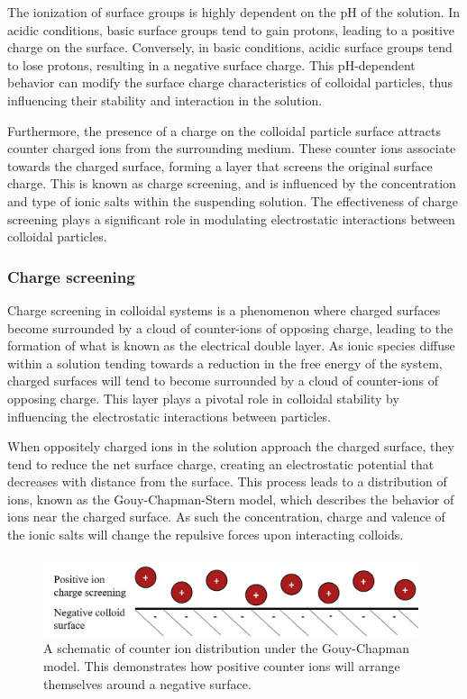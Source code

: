 The ionization of surface groups is highly dependent on the pH of the solution. In acidic conditions, basic surface groups tend to gain protons, leading to a positive charge on the surface. Conversely, in basic conditions, acidic surface groups tend to lose protons, resulting in a negative surface charge. This pH-dependent behavior can modify the surface charge characteristics of colloidal particles, thus influencing their stability and interaction in the solution.

Furthermore, the presence of a charge on the colloidal particle surface attracts counter charged ions from the surrounding medium. These counter ions associate towards the charged surface, forming a layer that screens the original surface charge. This is known as charge screening, and is influenced by the concentration and type of ionic salts within the suspending solution. The effectiveness of charge screening plays a significant role in modulating electrostatic interactions between colloidal particles.
\cite{Wennerstrom2017} \cite{lilBlueBook} \cite{israelachvili2011intermolecular}%

\subsubsection{Charge screening}



Charge screening in colloidal systems is a phenomenon where charged surfaces become surrounded by a cloud of counter-ions of opposing charge, leading to the formation of what is known as the electrical double layer. As ionic species diffuse within a solution tending towards a reduction in the free energy of the system, charged surfaces will tend to become surrounded by a cloud of counter-ions of opposing charge. This layer plays a pivotal role in colloidal stability by influencing the electrostatic interactions between particles. 

When oppositely charged ions in the solution approach the charged surface, they tend to reduce the net surface charge, creating an electrostatic potential that decreases with distance from the surface. This process leads to a distribution of ions, known as the Gouy-Chapman-Stern model, which describes the behavior of ions near the charged surface. As such the concentration, charge and valence of the ionic salts will change the repulsive forces upon interacting colloids.\cite{allagui2022gouy}

\begin{figure}[h]    
        \begin{center}
          \includegraphics[width=110mm]{chapter1/ioncloud.PNG}
\end{center}
\caption{A schematic of counter ion distribution under the Gouy-Chapman model. This demonstrates how positive counter ions will arrange themselves around a negative surface.}
\label{fig:ioncloud}                
\end{figure}

